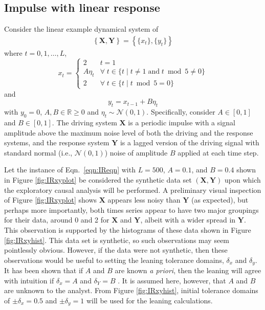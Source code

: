 \subsection{Impulse with linear response}
\label{sec:IR}
Consider the linear example dynamical system of
\begin{eqnarray}
\label{eqn:IReqn}
\left\{\mathbf{X},\mathbf{Y}\right\} = \left\{\{x_t\},\{y_t\}\right\}
\end{eqnarray}
where $t=0,1,\ldots,L$,
\begin{equation*}
x_t = \left\{
  \begin{array}{lr}
    2 & t = 1\\
    A\eta_t & \forall\; t\in\{t\;|\;t\neq 1 \;\mathrm{and}\; t\bmod 5 \neq 0\}\\
    2 & \forall\; t\in\{t\;|\;t\bmod 5 = 0\}
  \end{array}
\right.
\end{equation*}
and
\begin{equation*}
y_t = x_{t-1} + B\eta_t
\end{equation*}
with $y_0 = 0$, $A,B\in\mathbb{R}\ge 0$ and $\eta_t\sim\mathcal{N}\left(0,1\right)$.  Specifically, consider $A\in[0,1]$ and $B\in[0,1]$.  The driving system $\mathbf{X}$ is a periodic impulse with a signal amplitude above the maximum noise level of both the driving and the response systems, and the response system $\mathbf{Y}$ is a lagged version of the driving signal with standard normal (i.e.,  $\mathcal{N}\left(0,1\right)$) noise of amplitude $B$ applied at each time step.  

Let the instance of Eqn.\ \ref{eqn:IReqn} with $L=500$, $A=0.1$, and $B=0.4$ shown in Figure \ref{fig:IRxyplot} be considered the synthetic data set $(\mathbf{X},\mathbf{Y})$ upon which the exploratory causal analysis will be performed.  A preliminary visual inspection of Figure \ref{fig:IRxyplot} shows $\mathbf{X}$ appears less noisy than $\mathbf{Y}$ (as expected), but perhaps more importantly, both times series appear to have two major groupings for their data, around 0 and 2 for $\mathbf{X}$ and $\mathbf{Y}$, albeit with a wider spread in $\mathbf{Y}$.  This observation is supported by the histograms of these data shown in Figure \ref{fig:IRxyhist}.  This data set is synthetic, so such observations may seem pointlessly obvious.  However, if the data were not synthetic, then these observations would be useful to setting the leaning tolerance domains, $\delta_x$ and $\delta_y$.  It has been shown that if $A$ and $B$ are known {\em a priori}, then the leaning will agree with intuition if $\delta_x=A$ and $\delta_Y=B$ \cite{Weigel2014}.  It is assumed here, however, that $A$ and $B$ are unknown to the analyst.  From Figure \ref{fig:IRxyhist}, initial tolerance domains of $\pm\delta_x = 0.5$ and $\pm\delta_y=1$ will be used for the leaning calculations.  

